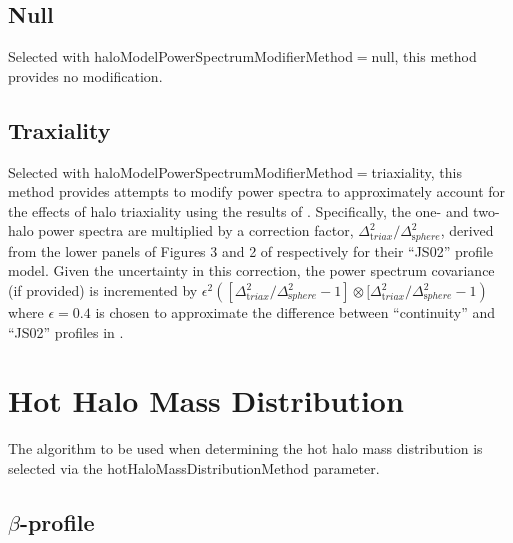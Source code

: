 \subsection{Null}\label{phys:haloModelPowerSpectrumModifier:haloModelPowerSpectrumModifierNull}

Selected with {\normalfont \ttfamily haloModelPowerSpectrumModifierMethod}$=${\normalfont \ttfamily null}, this method provides no modification.

\subsection{Traxiality}\label{phys:haloModelPowerSpectrumModifier:haloModelPowerSpectrumModifierTriaxiality}

Selected with {\normalfont \ttfamily haloModelPowerSpectrumModifierMethod}$=${\normalfont \ttfamily triaxiality}, this method provides attempts to modify power spectra to approximately account for the effects of halo triaxiality using the results of \cite{smith_triaxial_2005}. Specifically, the one- and two-halo power spectra are multiplied by a correction factor, $\Delta^2_{\mathrm triax}/\Delta^2_{\mathrm sphere}$, derived from the lower panels of Figures 3 and 2 of \cite{smith_triaxial_2005} respectively for their ``JS02'' profile model. Given the uncertainty in this correction, the power spectrum covariance (if provided) is incremented by $\epsilon^2 ( [\Delta^2_{\mathrm triax}/\Delta^2_{\mathrm sphere}-1] \otimes [\Delta^2_{\mathrm triax}/\Delta^2_{\mathrm sphere}-1)$ where $\epsilon=0.4$ is chosen to approximate the difference between ``continuity'' and ``JS02'' profiles in \cite{smith_triaxial_2005}.

\section{Hot Halo Mass Distribution}

The algorithm to be used when determining the hot halo mass distribution is selected via the {\normalfont \ttfamily hotHaloMassDistributionMethod} parameter.

\subsection{$\beta$-profile}\label{phys:hotHaloMassDistribution:hotHaloMassDistributionBetaProfile}

